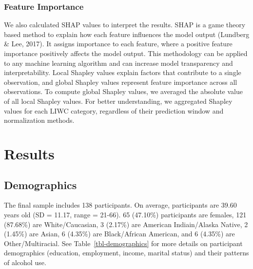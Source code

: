 \documentclass[
  letterpaper,
  DIV=11,
  numbers=noendperiod]{scrartcl}
\begin{document}
\subsubsection{Feature Importance}\label{feature-importance}

We also calculated SHAP values to interpret the results. SHAP is a game
theory based method to explain how each feature influences the model
output (Lundberg \& Lee, 2017). It assigns importance to each feature,
where a positive feature importance positively affects the model output.
This methodology can be applied to any machine learning algorithm and
can increase model transparency and interpretability. Local Shapley
values explain factors that contribute to a single observation, and
global Shapley values represent feature importance across all
observations. To compute global Shapley values, we averaged the absolute
value of all local Shapley values. For better understanding, we
aggregated Shapley values for each LIWC category, regardless of their
prediction window and normalization methods.

\newpage

\section{Results}\label{results}

\subsection{Demographics}\label{demographics}

The final sample includes 138 participants. On average, participants are
39.60 years old (SD = 11.17, range = 21-66). 65 (47.10\%) participants
are females, 121 (87.68\%) are White/Caucasian, 3 (2.17\%) are American
Indiain/Alaska Native, 2 (1.45\%) are Asian, 6 (4.35\%) are
Black/African American, and 6 (4.35\%) are Other/Multiracial. See
Table~\ref{tbl-demographics} for more details on participant
demographics (education, employment, income, marital status) and their
patterns of alcohol use.
\end{document}

